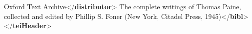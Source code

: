 \begin{shaded}
\hspace*{1em}\hspace*{1em}\mbox{}\newline 
\hspace*{1em}\mbox{}\newline 
\hspace*{1em}\mbox{}\newline 
\hspace*{1em}\hspace*{1em}Oxford Text Archive{</\textbf{distributor}>}\mbox{}\newline 
\hspace*{1em}\mbox{}\newline 
\hspace*{1em}\mbox{}\newline 
\hspace*{1em}\hspace*{1em}The complete writings of Thomas Paine, collected and edited\mbox{}\newline 
\hspace*{1em}\hspace*{1em}\hspace*{1em}\hspace*{1em}\hspace*{1em}\hspace*{1em} by Phillip S. Foner (New York, Citadel Press, 1945){</\textbf{bibl}>}\mbox{}\newline 
\hspace*{1em}\mbox{}\newline 
{}\mbox{}\newline 
{</\textbf{teiHeader}>}\end{shaded}\egroup\par \par
